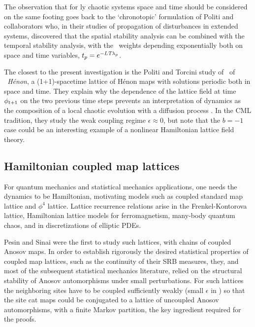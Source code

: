 The observation that for {\spt}ly chaotic systems space and time
should be considered on the same footing goes back to the `chronotopic' formulation
of Politi and
collaborators who, in their studies
of propagation of {\spt} disturbances in extended systems, discovered
that the spatial stability analysis can be combined with the
temporal stability analysis,
with the \twot\ weights depending exponentially both on space
and time variables, $t_p=e^{-{L_{}}{T_{}}\lambda_p}$.


The closest to the present investigation is the Politi and
Torcini study of \twots\ of \emph{\spt\ H{\'e}non}, a
(1+1)-spacetime lattice of H{\'e}non maps with solutions periodic
both in space and time.
They explain why the dependence
of the lattice field at time $\phi_{t + 1}$ on the two previous time
steps prevents an interpretation of dynamics as the composition of a
local chaotic evolution with a diffusion process .
In the CML tradition, they study the weak coupling regime $\epsilon\approx0$, but note that the
$b=-1$ case could be an interesting example of a nonlinear Hamiltonian
lattice field theory.


\subsection{Hamiltonian coupled map lattices}
\label{s:HCCMs}

For quantum
mechanics and statistical mechanics applications, one needs the dynamics to
be Hamiltonian, motivating models such as coupled standard map
lattice and
$\phi^4$ lattice.
%
Lattice recurrence relations arise in the
Frenkel-Kontorova lattice, Hamiltonian lattice models for ferromagnetism,
many-body quantum chaos, and in discretizations of elliptic PDEs.


Pesin and Sinai were the first to study such lattices, with
chains of coupled Anosov maps.
In order to establish rigorously the desired statistical
properties of coupled map lattices, such as the continuity of their {SRB}
measures, they, and most of the subsequent statistical mechanics literature,
relied on the structural stability of Anosov automorphisms under small
perturbations. For such lattices the neighboring sites have to be coupled
sufficiently weakly (small $\epsilon$ in ) so that the site
cat maps could be conjugated to a lattice of uncoupled Anosov automorphisms,
with a finite Markov partition, the key ingredient required for the proofs.

